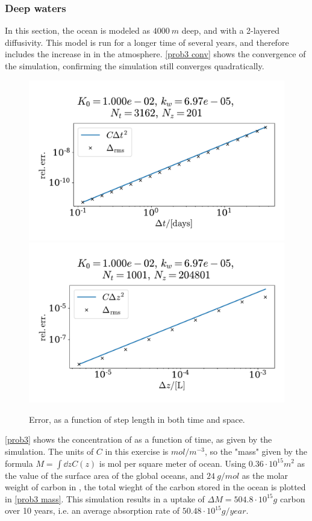 \documentclass{article}
\begin{document}
    \subsubsection*{Deep waters}
    In this section, the ocean is modeled as $\SI{4000}{m}$ deep, and with a 2-layered diffusivity. This model is run for a longer time of several years, and therefore includes the increase in  in the atmosphere. \autoref{prob3 conv} shows the convergence of the simulation, confirming the simulation still converges quadratically.

    \begin{figure}
        \centering
        \includegraphics[width=.49\textwidth]{../plots/prob3_conv_test_t}
        \includegraphics[width=.49\textwidth]{../plots/prob3_conv_test_z}
        \caption{Error, as a function of step length in both time and space.}
        \label{prob3 conv}
    \end{figure}

    \autoref{prob3} shows the concentration of  as a function of time, as given by the simulation. The units of $C$ in this exercise is $\si{mol / m^{-3}}$, so the "mass" given by the formula $M = \int \dd z C(z)$ is mol per square meter of ocean. Using $0.36 \cdot 10^{15}\si{m^2}$ as the value of the surface area of the global oceans, and $\SI{24}{g / mol}$ as the molar weight of carbon in , the total wieght of the carbon stored in the ocean is plotted in \autoref{prob3 mass}. This simulation results in a uptake of $\Delta M = 504.8 \cdot 10^{15} \si{g}$ carbon over 10 years, i.e. an average absorption rate of $50.48 \cdot 10^{15} \si{g/year}$.
\end{document}
